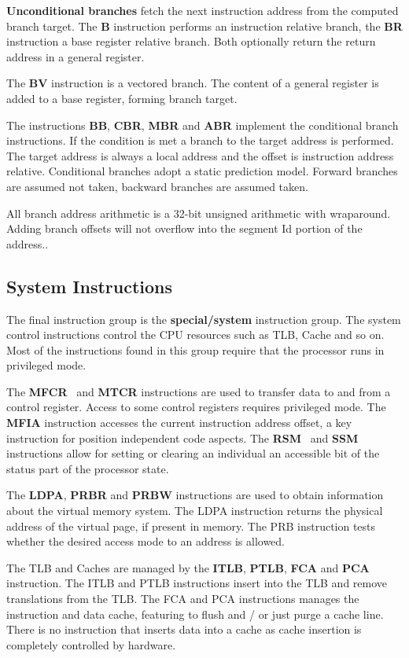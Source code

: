 \textbf{Unconditional branches} fetch the next instruction address from the computed branch target. The \textbf{B} instruction performs an instruction relative branch, the \textbf{BR} instruction a base register relative branch. Both optionally return the return address in a general register.

The \textbf{BV} instruction is a vectored branch. The content of a general register is added to a base register, forming branch target. 

The instructions \textbf{BB}, \textbf{CBR}, \textbf{MBR} and \textbf{ABR} implement the conditional branch instructions. If the condition is met a branch to the target address is performed. The target address is always a local address and the offset is instruction address relative. Conditional branches adopt a static prediction model. Forward branches are assumed not taken, backward branches are assumed taken.

All branch address arithmetic is a 32-bit unsigned arithmetic with wraparound. Adding branch offsets will not overflow into the segment Id portion of the address..

\subsection*{System Instructions}

The final instruction group is the \textbf{special/system} instruction group. The system control instructions control the CPU resources such as TLB, Cache and so on. Most of the instructions found in this group require that the processor runs in privileged mode.

The \textbf{MFCR}  and \textbf{MTCR} instructions are used to transfer data to and from a control register. Access to some control registers requires privileged mode. The \textbf{MFIA} instruction accesses the current instruction address offset, a key instruction for position independent code aspects.  The \textbf{RSM}  and \textbf{SSM} instructions allow for setting or clearing an individual an accessible bit of the status part of the processor state. 

The \textbf{LDPA}, \textbf{PRBR} and \textbf{PRBW} instructions are used to obtain information about the virtual memory system. The LDPA instruction returns the physical address of the virtual page, if present in memory. The PRB instruction tests whether the desired access mode to an address is allowed.

The TLB and Caches are managed by the \textbf{ITLB}, \textbf{PTLB}, \textbf{FCA} and \textbf{PCA}  instruction. The ITLB and PTLB instructions insert into the TLB and remove translations from the TLB. The FCA and PCA instructions manages the instruction and data cache, featuring to flush and / or just purge a cache line. There is no instruction that inserts data into a cache as cache insertion is completely controlled by hardware. 

